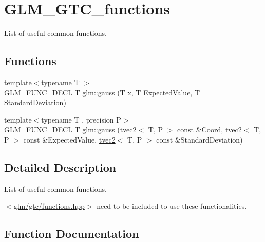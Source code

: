 \hypertarget{group__gtc__functions}{}\section{G\+L\+M\+\_\+\+G\+T\+C\+\_\+functions}
\label{group__gtc__functions}


List of useful common functions.  


\subsection*{Functions}
\begin{DoxyCompactItemize}
\item 
{\footnotesize template$<$typename T $>$ }\\\mbox{\hyperlink{setup_8hpp_ab2d052de21a70539923e9bcbf6e83a51}{G\+L\+M\+\_\+\+F\+U\+N\+C\+\_\+\+D\+E\+CL}} T \mbox{\hyperlink{group__gtc__functions_ga0b50b197ff74261a0fad90f4b8d24702}{glm\+::gauss}} (T \mbox{\hyperlink{glad_8h_a92d0386e5c19fb81ea88c9f99644ab1d}{x}}, T Expected\+Value, T Standard\+Deviation)
\item 
{\footnotesize template$<$typename T , precision P$>$ }\\\mbox{\hyperlink{setup_8hpp_ab2d052de21a70539923e9bcbf6e83a51}{G\+L\+M\+\_\+\+F\+U\+N\+C\+\_\+\+D\+E\+CL}} T \mbox{\hyperlink{group__gtc__functions_ga7448f9eb74bb5924f6330ab532f2899c}{glm\+::gauss}} (\mbox{\hyperlink{structglm_1_1tvec2}{tvec2}}$<$ T, P $>$ const \&Coord, \mbox{\hyperlink{structglm_1_1tvec2}{tvec2}}$<$ T, P $>$ const \&Expected\+Value, \mbox{\hyperlink{structglm_1_1tvec2}{tvec2}}$<$ T, P $>$ const \&Standard\+Deviation)
\end{DoxyCompactItemize}


\subsection{Detailed Description}
List of useful common functions. 

$<$\mbox{\hyperlink{functions_8hpp}{glm/gtc/functions.\+hpp}}$>$ need to be included to use these functionalities. 

\subsection{Function Documentation}
\mbox{\label{group__gtc__functions_ga0b50b197ff74261a0fad90f4b8d24702}} 
